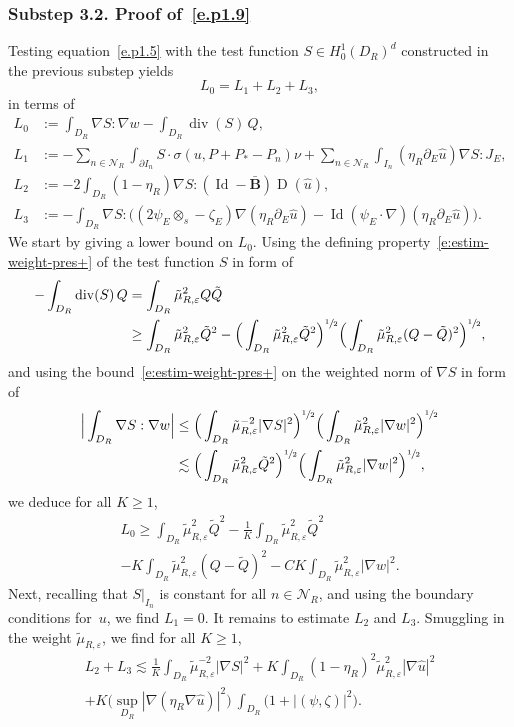 \documentclass[10pt]{amsart}
\let\mathcal\mathscr
\theoremstyle{plain}
\theoremstyle{definition}
\newcommand{\e}{\varepsilon}
\newcommand{\Nc}{\mathcal N}
\newcommand{\Id}{\operatorname{Id}}
\newcommand{\D}{\operatorname{D}}
\newcommand{\Bb}{\bar{\boldsymbol B}}
\newcommand{\Div}{{\operatorname{div}}}
\newcommand{\substep}[1]{\subsubsection*{Substep #1}}
\begin{document}
\substep{3.2. Proof of~\eqref{e.p1.9}}
Testing equation~\eqref{e.p1.5} with the test function $S\in H^1_0(D_R)^d$ constructed in the previous substep yields
\[L_0=L_1+L_2+L_3,\]
in terms of
\begin{align*}
L_0&:= \int_{D_R} \nabla S : \nabla w -\int_{D_R} \Div(S)\, Q,\\
L_1&:= -\sum_{n\in\Nc_R}\int_{\partial I_n}S\cdot\sigma(u,P+P_*-P_n)\nu+\sum_{n\in\Nc_R}\int_{I_n}(\eta_R\partial_E\hat u)\nabla S:J_E,\\
L_2&:= -2\int_{D_R} (1-\eta_R)\nabla S : (\Id-\Bb )\D(\hat u),\\
L_3&:= -\int_{D_R}\nabla S:\Big((2\psi_E\otimes_s-\zeta_E)\nabla(\eta_R\partial_E\hat u)-\Id(\psi_E\cdot\nabla)(\eta_R\partial_E\hat u)\Big).
\end{align*}
We start by giving a lower bound on $L_0$.
Using the defining property~\eqref{e:estim-weight-pres+} of the test function $S$ in form of
\begin{align*}
-\int_{D_R} \Div (S)\, Q&=\int_{D_R} \tilde \mu_{R,\e}^2 Q \tilde Q\\
&\ge \int_{D_R} \tilde \mu_{R,\e}^2 \tilde Q^2-\Big(\int_{D_R} \tilde \mu_{R,\e}^2 \tilde Q^2\Big)^{\sfrac12}\Big(\int_{D_R} \tilde \mu_{R,\e}^2 (Q-\tilde Q)^2\Big)^{\sfrac12},
\end{align*}
and using the bound~\eqref{e:estim-weight-pres+} on the weighted norm of $\nabla S$ in form of
\begin{align*}
\Big|\int_{D_R} \nabla S : \nabla w\Big|&\le \Big(\int_{D_R} \tilde \mu_{R,\e}^{-2} |\nabla S|^2\Big)^{\sfrac12}\Big( \int_{D_R} \tilde \mu_{R,\e}^{2} |\nabla w|^2\Big)^{\sfrac12}\\
&\lesssim \Big( \int_{D_R} \tilde \mu_{R,\e}^2 \tilde Q^2\Big)^{\sfrac12}\Big(\int_{D_R} \tilde \mu_{R,\e}^{2} |\nabla w|^2\Big)^{\sfrac12},
\end{align*}
we deduce for all $K\ge1$,
\begin{multline}\label{eq:lowerbnd-L0}
L_0\ge \int_{D_R}\tilde\mu_{R,\e}^2\tilde Q^2-\frac1K\int_{D_R}\tilde\mu_{R,\e}^2\tilde Q^2\\[-5pt]
-K\int_{D_R}\tilde\mu_{R,\e}^2(Q-\tilde Q)^2-CK\int_{D_R}\tilde\mu_{R,\e}^2|\nabla w|^2.
\end{multline}
Next, recalling that $S|_{I_n}$ is constant for all $n\in\Nc_R$, and using the boundary conditions for~$u$, we find $L_1=0$.
It remains to estimate $L_2$ and $L_3$.
Smuggling in the weight $\tilde\mu_{R,\e}$, we find for all $K\ge1$,
\begin{multline*}
L_2+L_3\lesssim \frac1K\int_{D_R}\tilde\mu_{R,\e}^{-2}|\nabla S|^2
+K\int_{D_R}(1-\eta_R)^2\tilde\mu_{R,\e}^2|\nabla\hat u|^2\\
+K\Big(\sup_{D_R}|\nabla(\eta_R\nabla\hat u)|^2\Big)~\int_{D_R}\big(1+|(\psi,\zeta)|^2\big).
\end{multline*}
\end{document}
